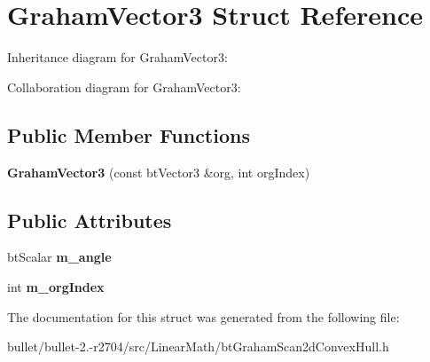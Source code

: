 \hypertarget{struct_graham_vector3}{\section{Graham\+Vector3 Struct Reference}
\label{struct_graham_vector3}
}


Inheritance diagram for Graham\+Vector3\+:


Collaboration diagram for Graham\+Vector3\+:
\subsection*{Public Member Functions}
\begin{DoxyCompactItemize}
\item 
\hypertarget{struct_graham_vector3_a8938d952ebb13495df3a293e3e399370}{{\bfseries Graham\+Vector3} (const bt\+Vector3 \&org, int org\+Index)}\label{struct_graham_vector3_a8938d952ebb13495df3a293e3e399370}

\end{DoxyCompactItemize}
\subsection*{Public Attributes}
\begin{DoxyCompactItemize}
\item 
\hypertarget{struct_graham_vector3_a224e64d09847d70c77b419c8e8ae2f98}{bt\+Scalar {\bfseries m\+\_\+angle}}\label{struct_graham_vector3_a224e64d09847d70c77b419c8e8ae2f98}

\item 
\hypertarget{struct_graham_vector3_addfae5bb53d7e2b96a3c64b545dcf416}{int {\bfseries m\+\_\+org\+Index}}\label{struct_graham_vector3_addfae5bb53d7e2b96a3c64b545dcf416}

\end{DoxyCompactItemize}


The documentation for this struct was generated from the following file\+:\begin{DoxyCompactItemize}
\item 
bullet/bullet-\/2.-\/r2704/src/\+Linear\+Math/bt\+Graham\+Scan2d\+Convex\+Hull.\+h\end{DoxyCompactItemize}
